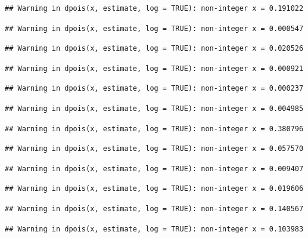 \documentclass[]{article}
\begin{document}
\begin{verbatim}
## Warning in dpois(x, estimate, log = TRUE): non-integer x = 0.191022
\end{verbatim}

\begin{verbatim}
## Warning in dpois(x, estimate, log = TRUE): non-integer x = 0.000547
\end{verbatim}

\begin{verbatim}
## Warning in dpois(x, estimate, log = TRUE): non-integer x = 0.020526
\end{verbatim}

\begin{verbatim}
## Warning in dpois(x, estimate, log = TRUE): non-integer x = 0.000921
\end{verbatim}

\begin{verbatim}
## Warning in dpois(x, estimate, log = TRUE): non-integer x = 0.000237
\end{verbatim}

\begin{verbatim}
## Warning in dpois(x, estimate, log = TRUE): non-integer x = 0.004985
\end{verbatim}

\begin{verbatim}
## Warning in dpois(x, estimate, log = TRUE): non-integer x = 0.380796
\end{verbatim}

\begin{verbatim}
## Warning in dpois(x, estimate, log = TRUE): non-integer x = 0.057570
\end{verbatim}

\begin{verbatim}
## Warning in dpois(x, estimate, log = TRUE): non-integer x = 0.009407
\end{verbatim}

\begin{verbatim}
## Warning in dpois(x, estimate, log = TRUE): non-integer x = 0.019606
\end{verbatim}

\begin{verbatim}
## Warning in dpois(x, estimate, log = TRUE): non-integer x = 0.140567
\end{verbatim}

\begin{verbatim}
## Warning in dpois(x, estimate, log = TRUE): non-integer x = 0.103983
\end{verbatim}
\end{document}
